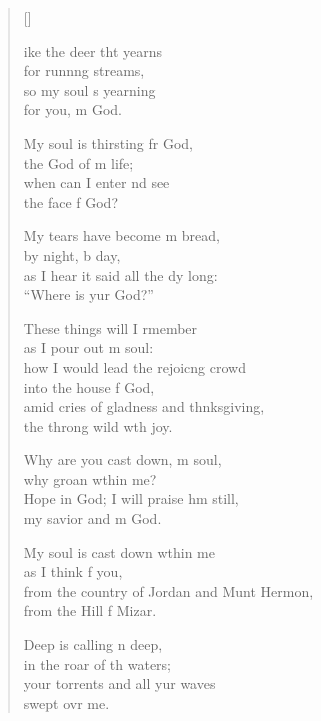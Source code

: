 \settowidth{\versewidth}{from the country of Jordan and Mount Hermon, *}
\begin{verse}[\versewidth]
  \begin{patverse}
ike the deer tht yearns\Med\\
for runn\pointup{\i}ng streams,\\
so my soul \pointup{\i}s yearning\Med\\
for you, m God.

My soul is thirsting fr God,\Med\\
the God of m life;\\
when can I enter nd see\Med\\
the face f God?

My tears have become m bread,\Med\\
by night, b day,\\
as I hear it said all the dy long:\Med\\
“Where is yur God?”

These things will I rmember\Med\\
as I pour out m soul:\\
how I would lead the rejoic\pointup{\i}ng crowd\Med\\
into the house f God,\\
amid cries of gladness and thnksgiving,\Med\\
the throng wild w\pointup{\i}th joy.

Why are you cast down, m soul,\Med\\
why groan w\pointup{\i}thin me?\\
Hope in God; I will praise h\pointup{\i}m still,\Med\\
my savior and m God.

My soul is cast down w\pointup{\i}thin me\Med\\
as I think f you,\\
from the country of Jordan and Munt Hermon,\Med\\
from the Hill f Mizar.

Deep is calling n deep,\Med\\
in the roar of th waters;\\
your torrents and all yur waves\Med\\
swept ovr me.


\end{patverse}
\end{verse}
